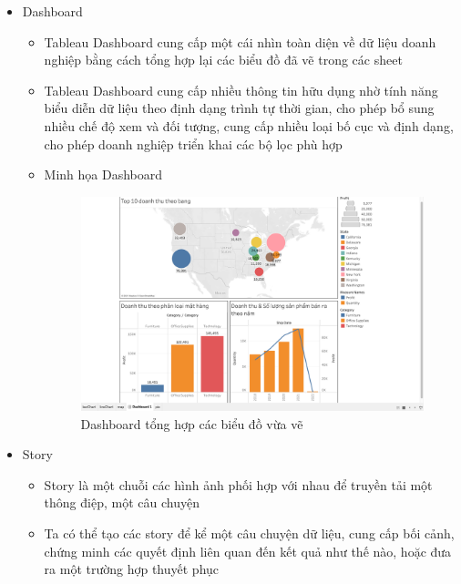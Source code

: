 \documentclass[a4paper, 12pt]{article}
\begin{document}
\begin{itemize}
    \item Dashboard 
    \begin{itemize}
        \item Tableau Dashboard cung cấp một cái nhìn toàn diện về dữ liệu doanh nghiệp bằng cách tổng hợp lại các biểu đồ đã vẽ trong các sheet
        \item Tableau Dashboard cung cấp nhiều thông tin hữu dụng nhờ tính năng biểu diễn dữ liệu theo định dạng trình tự thời gian, cho phép bổ sung nhiều chế độ xem và đối tượng, cung cấp nhiều loại bố cục và định dạng, cho phép doanh nghiệp triển khai các bộ lọc phù hợp
        \item Minh họa Dashboard
        \begin{figure}[H]
            \begin{center}
                \includegraphics[scale=0.4]{img/dashboard.png}
                \caption{Dashboard tổng hợp các biểu đồ vừa vẽ}
            \end{center}
        \end{figure}
    \end{itemize}

    \item Story
    \begin{itemize}
        \item Story là một chuỗi các hình ảnh phối hợp với nhau để truyền tải một thông điệp, một câu chuyện
        \item Ta có thể tạo các story để kể một câu chuyện dữ liệu, cung cấp bối cảnh, chứng minh các quyết định liên quan đến kết quả như thế nào, hoặc đưa ra một trường hợp thuyết phục
    \end{itemize}
\end{itemize}
\end{document}

